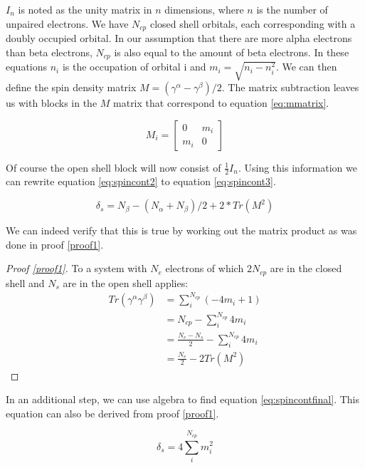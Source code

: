\documentclass[twoside,twocolumn,9pt]{article}
\begin{document}
$I_n$ is noted as the unity matrix in $n$ dimensions, where $n$ is the number of unpaired electrons. We have $N_{cp}$ closed shell orbitals, each corresponding with a doubly occupied
orbital. In our assumption that there are more alpha electrons than beta electrons, $N_{cp}$ is also equal to the amount of beta electrons. 
In these equations $n_i$ is the occupation of orbital i and $m_i = \sqrt{n_i - n_i^2}$\cite{Scuseria2010}. We can then define the spin density matrix 
$M = (\gamma^\alpha - \gamma^\beta)/2$. The matrix subtraction leaves us with blocks in the $M$ matrix that correspond to equation \eqref{eq:mmatrix}.

\begin{equation}\label{eq:mmatrix}
  M_i = \begin{bmatrix}
    0   & m_i \\
    m_i & 0
  \end{bmatrix}
\end{equation}

Of course the open shell block will now consist of $\frac{1}{2}I_n$. Using this information we can rewrite equation \eqref{eq:spincont2} to equation 
\eqref{eq:spincont3}\cite{Scuseria2010}. 

\begin{equation}\label{eq:spincont3}
  \delta_s = N_\beta - (N_\alpha + N_\beta)/2 + 2*Tr(M^2)
\end{equation}

We can indeed verify that this is true by working out the matrix product as was done in proof \ref{proof1}.

  \begin{proof}[Proof \ref{proof1}]\label{proof1}
    To a system with $N_e$ electrons of which $2N_{cp}$ are in the closed shell and $N_s$ are in the open shell applies:
    \begin{align*}
    Tr(\gamma^\alpha\gamma^\beta) &= \sum^{N_{cp}}_i (-4m_i + 1) \\
    &= N_{cp} - \sum^{N_{cp}}_i 4m_i \\
    &= \frac{N_e - N_s}{2} -\sum^{N_{cp}}_i 4m_i \\
    &= \frac{N_e}{2} - 2Tr(M^2)
  \end{align*}
  \end{proof}

In an additional step, we can use algebra to find equation \eqref{eq:spincontfinal}. This equation can also be derived from proof \ref{proof1}.

\begin{equation}\label{eq:spincontfinal}
  \delta_s = 4\sum^{N_{cp}}_i m_i^2
\end{equation}
\end{document}
